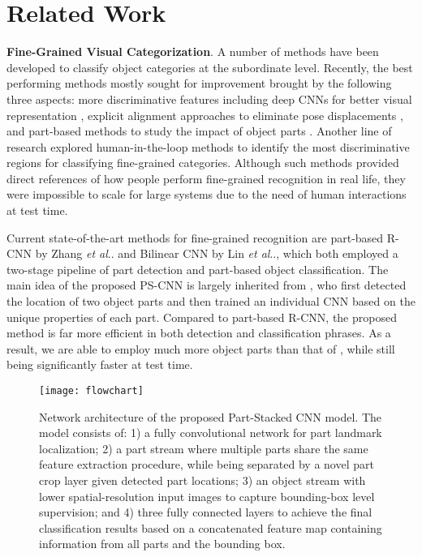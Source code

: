 \documentclass[10pt,twocolumn,letterpaper]{article}
\makeatletter
\DeclareRobustCommand\onedot{\futurelet\@let@token\@onedot}
\def\@onedot{\ifx\@let@token.\else.\null\fi\xspace}
\def\etal{\emph{et al}\onedot}
\makeatother
\begin{document}
\section{Related Work}\label{sec:relatedwork}
\noindent\textbf{Fine-Grained Visual Categorization}.
A number of methods have been developed to classify object categories at the subordinate level. Recently, the best performing methods mostly sought for improvement brought by the following three aspects: more discriminative features including deep CNNs for better visual representation \cite{bo2010kernel,sanchez2011fisher,krizhevsky2012imagenet,szegedy2014going,simonyan2014very}, explicit alignment approaches to eliminate pose displacements \cite{branson2014bird,gavves2014local}, and part-based methods to study the impact of object parts \cite{berg2013poof,zhang2014panda,maji2014part,zhang2014part,gkioxari2014actions}.
Another line of research explored human-in-the-loop methods \cite{branson2010visual,deng2013fine,wah2014similarity} to identify the most discriminative regions for classifying fine-grained categories. Although such methods provided direct references of how people perform fine-grained recognition in real life, they were impossible to scale for large systems due to the need of human interactions at test time.








Current state-of-the-art methods for fine-grained recognition are part-based R-CNN by Zhang \etal \cite{zhang2014part} and Bilinear CNN by Lin \etal \cite{lin2015bilinear}, which both employed a two-stage pipeline of part detection and part-based object classification. The main idea of the proposed PS-CNN is largely inherited from \cite{zhang2014part}, who first detected the location of two object parts and then trained an individual CNN based on the unique properties of each part. Compared to part-based R-CNN, the proposed method is far more efficient in both detection and classification phrases. As a result, we are able to employ much more object parts than that of \cite{zhang2014part}, while still being significantly faster at test time.


\begin{figure*}[Ht]
\begin{center}
\texttt{[image: flowchart]}
\end{center}
   \caption{Network architecture of the proposed Part-Stacked CNN model. The model consists of: 1) a fully convolutional network for part landmark localization; 2) a part stream where multiple parts share the same feature extraction procedure, while being separated by a novel part crop layer given detected part locations; 3) an object stream with lower spatial-resolution input images to capture bounding-box level supervision; and 4) three fully connected layers to achieve the final classification results based on a concatenated feature map containing information from all parts and the bounding box.}
\label{fig:architecture}
\end{figure*}
\end{document}
